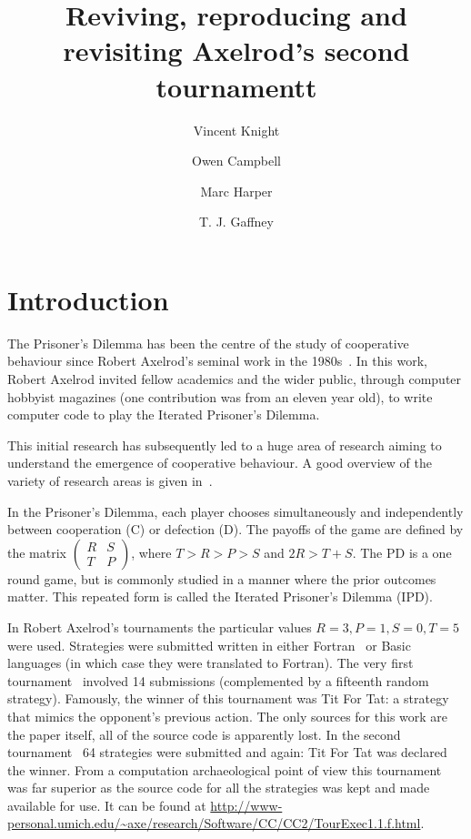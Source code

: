 \documentclass{article}
\title{Reviving, reproducing and revisiting Axelrod's second tournamentt}
\author{Vincent Knight \and Owen Campbell \and Marc Harper \and T. J. Gaffney}
\begin{document}
\maketitle

\section{Introduction}\label{sec:introduction}

The Prisoner's Dilemma has been the centre of the study of cooperative behaviour
since Robert Axelrod's seminal work in the 1980s~\cite{Axelrod1980a,
Axelrod1980b, Axelrodbook}. In this work, Robert Axelrod invited fellow
academics and the wider public, through computer hobbyist magazines (one
contribution was from an eleven year old), to write computer code to play the
Iterated Prisoner's Dilemma.

This initial research has subsequently led to a huge area
of research aiming to understand the emergence of cooperative behaviour. A good
overview of the variety of research areas is given in~\cite{Nowak2006}.

In the Prisoner's Dilemma, each player chooses
simultaneously and independently
between cooperation (C) or defection (D). The payoffs of
the game are defined by the matrix
\(
\begin{pmatrix}
    R & S \\ 
    T & P
\end{pmatrix}
\),
where $T > R > P > S$ and $2R > T + S$. The PD is a one
round game, but is commonly studied in a manner where the prior outcomes
matter. This repeated form is called the Iterated Prisoner's
Dilemma (IPD).


In Robert Axelrod's tournaments the particular values \(R=3, P=1, S=0, T=5\)
were used.  Strategies were submitted written in either
Fortran~\cite{smith1994programming} or Basic~\cite{Bishop2004}
languages (in which case they were translated to Fortran). The very first
tournament~\cite{Axelrod1980a} involved 14 submissions  (complemented by a
fifteenth random strategy). Famously, the winner of this tournament was Tit For
Tat: a strategy that mimics the opponent's previous action. The only sources
for this work are the paper itself, all of the source code is apparently lost.
In the second tournament~\cite{Axelrod1980b} 64 strategies were submitted and
again: Tit For Tat was declared the winner. From a computation archaeological
point of view this tournament was far superior as the source code for all the
strategies was kept and made available for use. It can be found at
\url{http://www-personal.umich.edu/~axe/research/Software/CC/CC2/TourExec1.1.f.html}.
\end{document}
